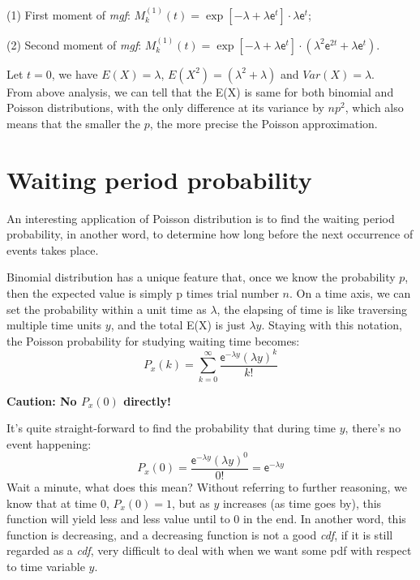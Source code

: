\documentclass[12pt]{article}
\begin{document}
(1) First moment of  \textit{mgf}: $ M_k ^{(1)} (t) = \exp [-\lambda +\lambda \mathsf{e}^t] \cdot \lambda \mathsf{e}^t $; 

(2) Second moment of \textit{mgf}: $ M_k ^{(1)} (t) = \exp [-\lambda +\lambda \mathsf{e}^t] \cdot ( \lambda ^2  \mathsf{e}^{2t} +  \lambda \mathsf{e}^t )$.

Let $t=0$,  we have $E(X)= \lambda$,  $E(X^2)= (\lambda ^2 + \lambda)$ and $Var(X)= \lambda$.\\


From above analysis,  we can tell that the E(X) is same for both binomial and Poisson distributions,  with the only difference at its variance by $np^2$,  which also means that the smaller the $p$,  the more precise the Poisson approximation.


\section{Waiting period probability}

An interesting application of Poisson distribution is to find the waiting period probability,  in another word,  to determine how long before the next occurrence of events takes place.  

Binomial distribution has a unique feature that,  once we know the probability $p$,  then the expected value is simply p times trial number $n$.  On a time axis,  we can set the probability within a unit time as $\lambda$,  the elapsing of time is like traversing multiple time units $y$,  and the total E(X) is just $\lambda y$.  Staying with this notation, the Poisson probability for studying waiting time becomes: 
$$ P_x (k) = \sum _{k=0} ^{\infty} \frac{\mathsf{e}^{-\lambda y} (\lambda y)^k }{k!} $$ 

\textbf{Caution: No $P_x (0)$ directly!}

It's quite straight-forward to find the probability that during time $y$,  there's no event happening: 
$$ P_x (0) = \frac{\mathsf{e}^{-\lambda y} (\lambda y)^0 }{0!} = \mathsf{e}^{-\lambda y}$$
Wait a minute,  what does this mean? Without referring to further reasoning,  we know that at time 0,  $P_x (0) = 1$,  but as $y$ increases (as time goes by),  this function will yield less and less value until to 0 in the end.  In another word,  this function is decreasing,  and a decreasing function is not a good \textit {cdf},  if it is still regarded as a \textit {cdf},  very difficult to deal with when we want some pdf with respect to time variable $y$. \\
\end{document}
